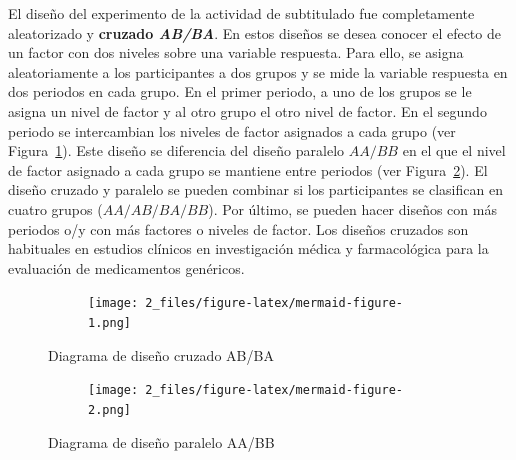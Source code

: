 \documentclass[
  12pt,
  a4paper,
  extrafontsizes,
  onecolumn,
  openright,
  table]{memoir}
\begin{document}
El diseño del experimento de la actividad de subtitulado fue
completamente aleatorizado y \textbf{cruzado \emph{AB/BA}}. En estos
diseños se desea conocer el efecto de un factor con dos niveles sobre
una variable respuesta. Para ello, se asigna aleatoriamente a los
participantes a dos grupos y se mide la variable respuesta en dos
periodos en cada grupo. En el primer periodo, a uno de los grupos se le
asigna un nivel de factor y al otro grupo el otro nivel de factor. En el
segundo periodo se intercambian los niveles de factor asignados a cada
grupo (ver Figura~\ref{fig-ab-ba}). Este diseño se diferencia del diseño
paralelo \(AA/BB\) en el que el nivel de factor asignado a cada grupo se
mantiene entre periodos (ver Figura~\ref{fig-aa-bb}). El
\gls{diseño cruzado} y paralelo se pueden combinar si los participantes
se clasifican en cuatro grupos (\(AA/AB/BA/BB\)). Por último, se pueden
hacer diseños con más periodos o/y con más factores o niveles de factor.
Los diseños cruzados son habituales en estudios clínicos en
investigación médica \autocite[ver][]{lim2021} y farmacológica para la
evaluación de medicamentos genéricos.

\begin{figure}

{\centering 

\begin{figure}[H]

{\centering \texttt{[image: 2\_files/figure-latex/mermaid-figure-1.png]}

}

\end{figure}

}

\caption{\label{fig-ab-ba}Diagrama de diseño cruzado AB/BA}

\end{figure}

\begin{figure}

{\centering 

\begin{figure}[H]

{\centering \texttt{[image: 2\_files/figure-latex/mermaid-figure-2.png]}

}

\end{figure}

}

\caption{\label{fig-aa-bb}Diagrama de diseño paralelo AA/BB}

\end{figure}
\end{document}

